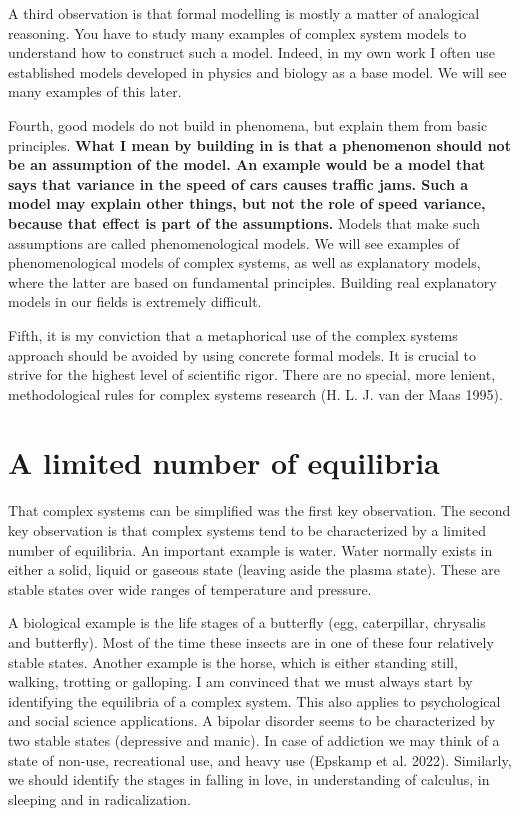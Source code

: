 \documentclass[
  letterpaper,
]{scrbook}
\begin{document}
A third observation is that formal modelling is mostly a matter of
analogical reasoning. You have to study many examples of complex system
models to understand how to construct such a model. Indeed, in my own
work I often use established models developed in physics and biology as
a base model. We will see many examples of this later.

Fourth, good models do not build in phenomena, but explain them from
basic principles. \textbf{What I mean by building in is that a
phenomenon should not be an assumption of the model. An example would be
a model that says that variance in the speed of cars causes traffic
jams. Such a model may explain other things, but not the role of speed
variance, because that effect is part of the assumptions.} Models that
make such assumptions are called phenomenological models. We will see
examples of phenomenological models of complex systems, as well as
explanatory models, where the latter are based on fundamental
principles. Building real explanatory models in our fields is extremely
difficult.

Fifth, it is my conviction that a metaphorical use of the complex
systems approach should be avoided by using concrete formal models. It
is crucial to strive for the highest level of scientific rigor. There
are no special, more lenient, methodological rules for complex systems
research (H. L. J. van der Maas 1995).

\hypertarget{a-limited-number-of-equilibria}{%
\section{A limited number of
equilibria}\label{a-limited-number-of-equilibria}}

That complex systems can be simplified was the first key observation.
The second key observation is that complex systems tend to be
characterized by a limited number of equilibria. An important example is
water. Water normally exists in either a solid, liquid or gaseous state
(leaving aside the plasma state). These are stable states over wide
ranges of temperature and pressure.

A biological example is the life stages of a butterfly (egg,
caterpillar, chrysalis and butterfly). Most of the time these insects
are in one of these four relatively stable states. Another example is
the horse, which is either standing still, walking, trotting or
galloping. I am convinced that we must always start by identifying the
equilibria of a complex system. This also applies to psychological and
social science applications. A bipolar disorder seems to be
characterized by two stable states (depressive and manic). In case of
addiction we may think of a state of non-use, recreational use, and
heavy use (Epskamp et al. 2022). Similarly, we should identify the
stages in falling in love, in understanding of calculus, in sleeping and
in radicalization.
\end{document}
